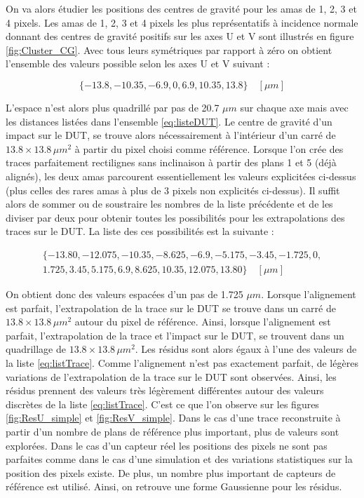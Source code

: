    \medskip
   
   On va alors \'etudier les positions des centres de gravit\'e pour les amas de 1, 2, 3 et 4 pixels. Les amas de 1, 2, 3 et 4 pixels les plus repr\'esentatifs \`a incidence normale donnant des centres de gravit\'e positifs sur les axes U et V sont illustr\'es en figure \ref{fig:Cluster_CG}. Avec tous leurs sym\'etriques par rapport \`a z\'ero on obtient l'ensemble des valeurs possible selon les axes U et V suivant :
   
   \begin{equation}
    \{-13.8, -10.35, -6.9, 0, 6.9, 10.35, 13.8\} \quad [\mu m]
    \label{eq:listeDUT}
   \end{equation}
   
   L'espace n'est alors plus quadrill\'e par pas de 20.7 $\mu m$ sur chaque axe mais avec les distances list\'ees dans l'ensemble \ref{eq:listeDUT}. Le centre de gravit\'e d'un impact sur le DUT, se trouve alors n\'ecessairement \`a l'int\'erieur d'un carr\'e de $13.8 \times 13.8 \, \mu m^2$ \`a partir du pixel choisi comme r\'ef\'erence. Lorsque l'on cr\'ee des traces parfaitement rectilignes sans inclinaison \`a partir des plans 1 et 5 (d\'ej\`a align\'es), les deux amas parcourent essentiellement les valeurs explicit\'ees ci-dessus (plus celles des rares amas \`a plus de 3 pixels non explicit\'es ci-dessus). Il suffit alors de sommer ou de soustraire les nombres de la liste pr\'ec\'edente et de les diviser par deux pour obtenir toutes les possibilit\'es pour les extrapolations des traces sur le DUT. La liste des ces possibilit\'es est la suivante : 

   \begin{multline}
    \{-13.80, -12.075, -10.35, -8.625, -6.9, -5.175, -3.45, -1.725, 0, \\
    1.725, 3.45, 5.175, 6.9, 8.625, 10.35, 12.075, 13.80\} \quad [\mu m]
   \label{eq:listTrace}
   \end{multline} 
   
   On obtient donc des valeurs espac\'ees d'un pas de 1.725 $\mu m$. Lorsque l'alignement est parfait, l'extrapolation de la trace sur le DUT se trouve dans un carr\'e de $13.8 \times 13.8 \, \mu m^2$ autour du pixel de r\'ef\'erence. Ainsi, lorsque l'alignement est parfait, l'extrapolation de la trace et l'impact sur le DUT, se trouvent dans un quadrillage de $13.8 \times 13.8 \, \mu m^2$. Les r\'esidus sont alors \'egaux \`a l'une des valeurs de la liste \ref{eq:listTrace}. Comme l'alignement n'est pas exactement parfait, de l\'eg\`eres variations de l'extrapolation de la trace sur le DUT sont observ\'ees. Ainsi, les r\'esidus prennent des valeurs tr\`es l\'eg\`erement diff\'erentes autour des valeurs discr\`etes de la liste \ref{eq:listTrace}. C'est ce que l'on observe sur les figures \ref{fig:ResU_simple} et \ref{fig:ResV_simple}. Dans le cas d'une trace reconstruite \`a partir d'un nombre de plans de r\'ef\'erence plus important, plus de valeurs sont explor\'ees. Dans le cas d'un capteur r\'eel les positions des pixels ne sont pas parfaites comme dans le cas d'une simulation et des variations statistiques sur la position des pixels existe. De plus, un nombre plus important de capteurs de r\'ef\'erence est utilis\'e. Ainsi, on retrouve une forme Gaussienne pour les r\'esidus.
  
